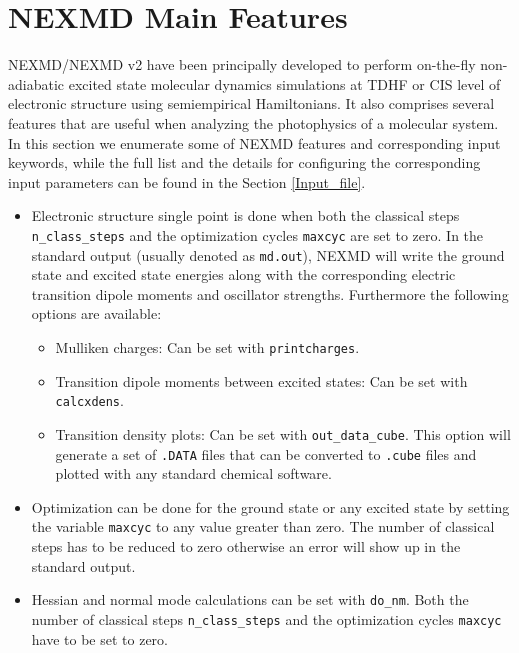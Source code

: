 \section{NEXMD Main Features}

NEXMD/NEXMD v2 have been principally developed to perform on-the-fly non-adiabatic excited state molecular dynamics simulations at TDHF or CIS level of electronic structure using semiempirical Hamiltonians. It also comprises several features that are useful when analyzing the photophysics of a molecular system. In this section we enumerate some of NEXMD features and corresponding input keywords, while the full list and the details for configuring the corresponding input parameters can be found in the Section \ref{Input_file}.

\begin{itemize}
\item Electronic structure single point is done when both the classical steps \verb+n_class_steps+ and the optimization cycles \verb+maxcyc+ are set to zero. In the standard output (usually denoted as \verb+md.out+), NEXMD will write the ground state and excited state energies along with the corresponding electric transition dipole moments and oscillator strengths. Furthermore the following options are available:
    \begin{itemize}
        \item Mulliken charges: Can be set with \verb+printcharges+.
        \item Transition dipole moments between excited states: Can be set with \verb+calcxdens+.
        \item Transition density plots: Can be set with \verb+out_data_cube+. This option will generate a set of \verb+.DATA+ files that can be converted to \verb+.cube+ files and plotted with any standard chemical software. 
    \end{itemize}

\item Optimization can be done for the ground state or any excited state by setting the variable \verb+maxcyc+ to any value greater than zero. The number of classical steps has to be reduced to zero otherwise an error will show up in the standard output. 

\item Hessian and normal mode calculations can be set with \verb+do_nm+. Both the number of classical steps \verb+n_class_steps+ and the optimization cycles \verb+maxcyc+ have to be set to zero.


\end{itemize}
